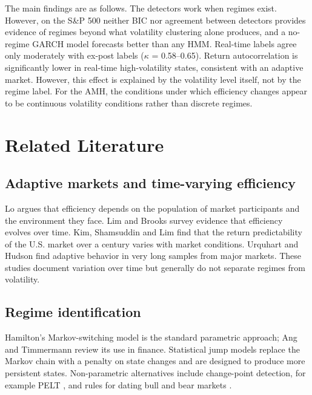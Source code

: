 \documentclass[conference]{IEEEtran}
\begin{document}
The main findings are as follows. The detectors work when regimes exist. However, on the S\&P 500 neither BIC nor agreement between detectors provides evidence of regimes beyond what volatility clustering alone produces, and a no-regime GARCH model forecasts better than any HMM. Real-time labels agree only moderately with ex-post labels ($\kappa$ = 0.58--0.65). Return autocorrelation is significantly lower in real-time high-volatility states, consistent with an adaptive market. However, this effect is explained by the volatility level itself, not by the regime label. For the AMH, the conditions under which efficiency changes appear to be continuous volatility conditions rather than discrete regimes.

\section{Related Literature}

\subsection{Adaptive markets and time-varying efficiency}
Lo \cite{lo2004, lo2017} argues that efficiency depends on the population of market participants and the environment they face. Lim and Brooks \cite{limbrooks2011} survey evidence that efficiency evolves over time. Kim, Shamsuddin and Lim \cite{kim2011} find that the return predictability of the U.S. market over a century varies with market conditions. Urquhart and Hudson \cite{urquhart2013} find adaptive behavior in very long samples from major markets. These studies document variation over time but generally do not separate regimes from volatility.

\subsection{Regime identification}
Hamilton's Markov-switching model \cite{hamilton1989} is the standard parametric approach; Ang and Timmermann \cite{angtimmermann2012} review its use in finance. Statistical jump models \cite{nystrup2020, shu2024} replace the Markov chain with a penalty on state changes and are designed to produce more persistent states. Non-parametric alternatives include change-point detection, for example PELT \cite{killick2012}, and rules for dating bull and bear markets \cite{lunde2004}.
\end{document}
